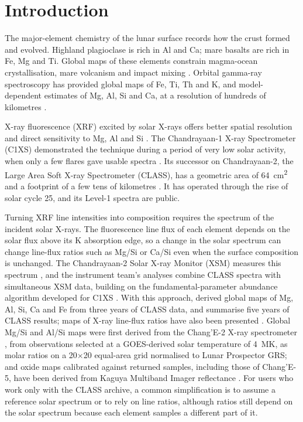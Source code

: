 \section{Introduction}\label{sec:intro}

The major-element chemistry of the lunar surface records how the crust formed and evolved. Highland plagioclase is rich in Al and Ca; mare basalts are rich in Fe, Mg and Ti. Global maps of these elements constrain magma-ocean crystallisation, mare volcanism and impact mixing \citep{Heiken1991}. Orbital gamma-ray spectroscopy has provided global maps of Fe, Ti, Th and K, and model-dependent estimates of Mg, Al, Si and Ca, at a resolution of hundreds of kilometres \citep{Lawrence1998,Prettyman2006}.

X-ray fluorescence (XRF) excited by solar X-rays offers better spatial resolution and direct sensitivity to Mg, Al and Si \citep{Jenkins1999,Beckhoff2006}. The Chandrayaan-1 X-ray Spectrometer (C1XS) demonstrated the technique during a period of very low solar activity, when only a few flares gave usable spectra \citep{Grande2009,Narendranath2011}. Its successor on Chandrayaan-2, the Large Area Soft X-ray Spectrometer (CLASS), has a geometric area of \SI{64}{cm^2} and a footprint of a few tens of kilometres \citep{Narendranath2014,Radhakrishna2020,Pillai2021}. It has operated through the rise of solar cycle 25, and its Level-1 spectra are public.

Turning XRF line intensities into composition requires the spectrum of the incident solar X-rays. The fluorescence line flux of each element depends on the solar flux above its K absorption edge, so a change in the solar spectrum can change line-flux ratios such as Mg/Si or Ca/Si even when the surface composition is unchanged. The Chandrayaan-2 Solar X-ray Monitor (XSM) measures this spectrum \citep{Mithun2020}, and the instrument team's analyses combine CLASS spectra with simultaneous XSM data, building on the fundamental-parameter abundance algorithm developed for C1XS \citep{Athiray2013a,Athiray2013b}. With this approach, \citet{Narendranath2024} derived global maps of Mg, Al, Si, Ca and Fe from three years of CLASS data, and \citet{Narendranath2025} summarise five years of CLASS results; maps of X-ray line-flux ratios have also been presented \citep{Kumar2026}. Global Mg/Si and Al/Si maps were first derived from the Chang'E-2 X-ray spectrometer \citep{Dong2016}, from observations selected at a GOES-derived solar temperature of \SI{4}{MK}, as molar ratios on a 20\textdegree{}$\times$20\textdegree{} equal-area grid normalised to Lunar Prospector GRS; and oxide maps calibrated against returned samples, including those of Chang'E-5, have been derived from Kaguya Multiband Imager reflectance \citep{Wang2021,Zhang2023}. For users who work only with the CLASS archive, a common simplification is to assume a reference solar spectrum or to rely on line ratios, although ratios still depend on the solar spectrum because each element samples a different part of it.

